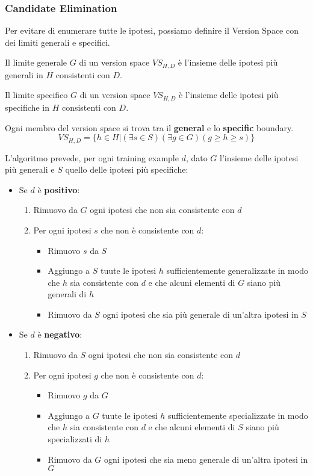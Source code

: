 \subsubsection{Candidate Elimination}
Per evitare di enumerare tutte le ipotesi, possiamo definire il Version Space con dei limiti generali e specifici.
\begin{definition}
	Il limite generale $G$ di un version space $VS_{H,D}$ è l'insieme delle ipotesi più generali in $H$ consistenti con $D$.
\end{definition}
\begin{definition}
	Il limite specifico $G$ di un version space $VS_{H,D}$ è l'insieme delle ipotesi più specifiche in $H$ consistenti con $D$.
\end{definition}
\begin{theorem}
	Ogni membro del version space si trova tra il \textbf{general} e lo \textbf{specific} boundary.
	\begin{equation}
		VS_{H,D} = \{h \in H \vert (\exists s \in S) (\exists g \in G) (g\geq h \geq s)\}
	\end{equation}
\end{theorem}
L'algoritmo prevede, per ogni training example $d$, dato $G$ l'insieme delle ipotesi più generali e $S$ quello delle ipotesi più specifiche:
\begin{itemize}
	\item Se $d$ è \textbf{positivo}:
	\begin{enumerate}
		\item Rimuovo da $G$ ogni ipotesi che non sia consistente con $d$
		\item Per ogni ipotesi $s$ che non è consistente con $d$:
		\begin{itemize}
			\item Rimuovo $s$ da $S$
			\item Aggiungo a $S$ tuute le ipotesi $h$ sufficientemente generalizzate in modo che $h$ sia consistente con $d$ e che alcuni elementi di $G$ siano più generali di $h$
			\item Rimuovo da $S$ ogni ipotesi che sia più generale di un'altra ipotesi in $S$
		\end{itemize}
	\end{enumerate}
	\item Se $d$ è \textbf{negativo}:
	\begin{enumerate}
		\item Rimuovo da $S$ ogni ipotesi che non sia consistente con $d$
		\item Per ogni ipotesi $g$ che non è consistente con $d$:
		\begin{itemize}
			\item Rimuovo $g$ da $G$
			\item Aggiungo a $G$ tuute le ipotesi $h$ sufficientemente specializzate in modo che $h$ sia consistente con $d$ e che alcuni elementi di $S$ siano più specializzati di $h$
			\item Rimuovo da $G$ ogni ipotesi che sia meno generale di un'altra ipotesi in $G$
		\end{itemize}
	\end{enumerate}
\end{itemize}
